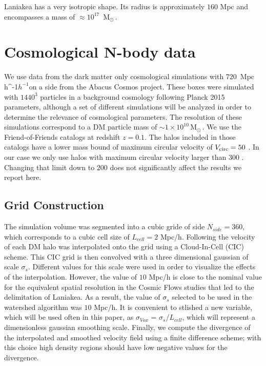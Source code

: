 \documentclass[usenatbib]{mnras}
\newcommand{\Msun}{\,{\rm M}$_{\odot}$\,}
\newcommand{\Mpch}{\,{\rm Mpc}\,\ifmmode h^{-1}\else $h^{-1}$\fi}
\begin{document}
Laniakea has a very isotropic shape. 
Its radius is approximately $160$ Mpc and encompasses a mass of
$\approx 10^{17}$ \Msun.



\section{Cosmological N-body data}

We use data from the dark matter only cosmological simulations with
$720$ \Mpch on a side from the Abacus Cosmos project.  
These boxes were simulated with $1440^3$ particles in a background
cosmology following Planck 2015 parameters, although a set of
different simulations will be analyzed in order to determine the
relevance of cosmological parameters.
The resolution of these simulations correspond to a DM particle mass
of $\sim 1 \times 10^{10}$\Msun.
We use the Friend-of-Friends catalogs at redshift $z=0.1$.
The halos included in those catalogs have a lower mass bound of 
maximum circular velocity of $V_{\rm circ}=50$ \kms.
In our case we only use halos with maximum circular velocity larger
than $300$ \kms.
Changing that limit down to $200$ \kms does not significantly affect
the results we report here.

\subsection{Grid Construction}  

The simulation volume was segmented into a cubic gride of side $N_{side}=360$, 
which corresponds to a cubic cell size of $L_{cell}=2$ Mpc/h.
Following \cite{2014Natur.513...71T} the velocity of each DM halo was interpolated onto the
grid using a Cloud-In-Cell (CIC) scheme. 
This CIC grid is then convolved with a three dimensional gaussian of scale $\sigma_s$.
Different values for this scale were used in order to visualize the effects of the interpolation. However, the value of $10$ Mpc/h is close to the nominal value for the equivalent spatial resolution
in the Cosmic Flows studies that led to the delimitation of Laniakea. As a result, the value of $\sigma_s$ selected to be used in the watershed algorithm was $10$ Mpc/h. It is convenient to stlished a new variable, which will be used often in this paper, as $\sigma_{Vox}$ = $\sigma_s$/$L_{cell}$, which will represent a dimensionless gaussian smoothing scale. 
Finally, we compute the divergence of the interpolated and smoothed velocity field using a
finite difference scheme; with this choice high density regions should have low negative
values for the divergence.
\end{document}
